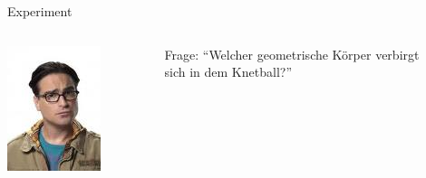 \documentclass{beamer}
\begin{document}
\begin{frame}
  \begin{center}
    {\Huge Experiment}
  \end{center}
   \begin{block}{}
     \begin{columns}
       \begin{column}{0.3\textwidth}
         \centering
         \includegraphics[height=0.3\textheight]{eyecandy/Lennard}
       \end{column}
       \begin{column}{0.7\textwidth}
         {\large Frage:}
         \vskip0.2cm
         \alert{``Welcher geometrische K\"orper verbirgt\\ sich in dem Knetball?''}
       \end{column}
     \end{columns}
   \end{block}
\end{frame}


\end{document}
